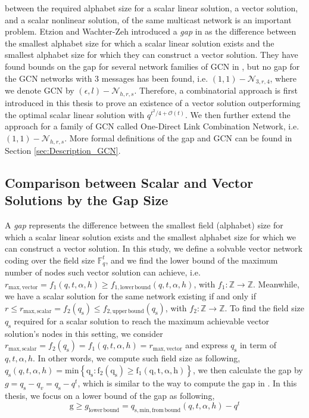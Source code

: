 between the required alphabet size for a scalar linear solution, a
vector solution, and a scalar nonlinear solution, of the same multicast
network is an important problem. Etzion and Wachter-Zeh introduced
a \textit{gap} in \cite{Etzion:2016} as the difference between the
smallest alphabet size for which a scalar linear solution exists and
the smallest alphabet size for which they can construct a vector solution.
They have found bounds on the gap for several network families of
GCN in \cite{Etzion:2016,Wachter-Zeh:2018}, but no gap for the GCN
networks with 3 messages has been found, i.e. $(1,1)-\mathcal{N}_{3,r,4}$,
where we denote GCN by $(\epsilon,l)-\mathcal{N}_{h,r,s}$. Therefore,
a combinatorial approach is first introduced in this thesis to prove
an existence of a vector solution outperforming the optimal scalar
linear solution with $q^{t^{2}/4+\mathcal{O}(t)}$. We then further
extend the approach for a family of GCN called One-Direct Link Combination
Network, i.e. $(1,1)-\mathcal{N}_{h,r,s}$. More formal definitions
of the gap and GCN can be found in Section \ref{sec:Description_GCN}.

\subsection{Comparison between Scalar and Vector Solutions by the Gap Size \label{subsec:Comparison-between-scalar-and-vector-sol}}

A \textit{gap} represents the difference between the smallest field
(alphabet) size for which a scalar linear solution exists and the
smallest alphabet size for which we can construct a vector solution.
In this study, we define a solvable vector network coding over the
field size $\ensuremath{\mathbb{F}}_{q}^{t}$, and we find the lower
bound of the maximum number of nodes such vector solution can achieve,
i.e. $r_{\mathrm{max,vector}}=f_{\mathrm{1}}(q,t,\alpha,h)\geq f_{\mathrm{1,lower\,bound}}\left(q,t,\alpha,h\right)$,
with $f_{\mathrm{1}}:\mathbb{Z}\rightarrow\mathbb{Z}$. Meanwhile,
we have a scalar solution for the same network existing if and only
if $r\leq r_{\mathrm{max,scalar}}=f_{\mathrm{2}}\left(q_{\mathrm{s}}\right)\leq f_{\mathrm{2,upper\,bound}}\left(q_{\mathrm{s}}\right)$,
with $f_{\mathrm{2}}:\mathbb{Z}\rightarrow\mathbb{Z}$. To find the
field size $q_{\mathrm{s}}$ required for a scalar solution to reach
the maximum achievable vector solution's nodes in this setting, we
consider $r_{\mathrm{max,scalar}}=f_{\mathrm{2}}\left(q_{\mathrm{s}}\right)=f_{\mathrm{1}}(q,t,\alpha,h)=r_{\mathrm{max,vector}}$
and express $q_{\mathrm{s}}$ in term of $q,t,\alpha,h$. In other
words, we compute such field size as following, $q_{\mathrm{s}}\left(q,t,\alpha,h\right)=\mathrm{\mathrm{min}\left\{ q_{\mathrm{s}}:f_{\mathrm{2}}\left(q_{\mathrm{s}}\right)\geq f_{\mathrm{1}}\left(q,t,\alpha,h\right)\right\} }$,
we then calculate the gap by $g=q_{\mathrm{s}}-q_{v}=q_{\mathrm{s}}-q^{t}$,
which is similar to the way to compute the gap in \cite{Wachter-Zeh:2018}.
In this thesis, we focus on a lower bound of the gap as following,
\[
\text{g}\geq g_{\mathrm{lower\,bound}}=q_{\mathrm{s,min,from\,bound}}(q,t,\alpha,h)-q^{t}
\]

